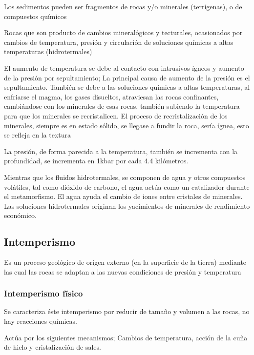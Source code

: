 Los sedimentos pueden ser fragmentos de rocas y/o minerales (terrígenas), o de compuestos químicos

\begin{definition}
    Rocas que son producto de cambios mineralógicos y tecturales, ocasionados por cambios de temperatura, presión y circulación de soluciones químicas a altas temperaturas (hidrotermales)
\end{definition}

El aumento de temperatura se debe al contacto con intrusivos ígneos y aumento de la presión por sepultamiento; La principal causa de aumento de la presión es el sepultamiento. También se debe a las soluciones químicas a altas temperaturas, al enfriarse el magma, los gases disueltos, atraviesan las  rocas confinantes, cambiándose con los minerales de esas rocas, también subiendo la temperatura para que los minerales se recristalicen. El proceso de recristalización de los minerales, siempre es en estado sólido, se llegase a fundir la roca, sería ígnea, esto se refleja en la textura

La presión, de forma parecida a la temperatura, también se incrementa con la profundidad, se incrementa en 1kbar por cada 4.4 kilómetros.

Mientras que los fluidos hidrotermales, se componen de agua y otros compuestos volátiles, tal como dióxido de carbono, el agua actúa como un catalizador durante el metamorfismo. El agua ayuda el cambio de iones entre cristales de minerales. Las soluciones hidrotermales originan los yacimientos de minerales de rendimiento económico.

\subsection{Intemperismo}

Es un proceso geológico de origen externo (en la superficie de la tierra) mediante las cual las rocas se adaptan a las nuevas condiciones de presión y temperatura

\subsubsection{Intemperismo físico}

Se caracteriza éste intemperismo por reducir de tamaño y volumen a las rocas, no hay reacciones químicas.

Actúa por los siguientes mecanismos; Cambios de temperatura, acción de la cuña de hielo y cristalización de sales.

